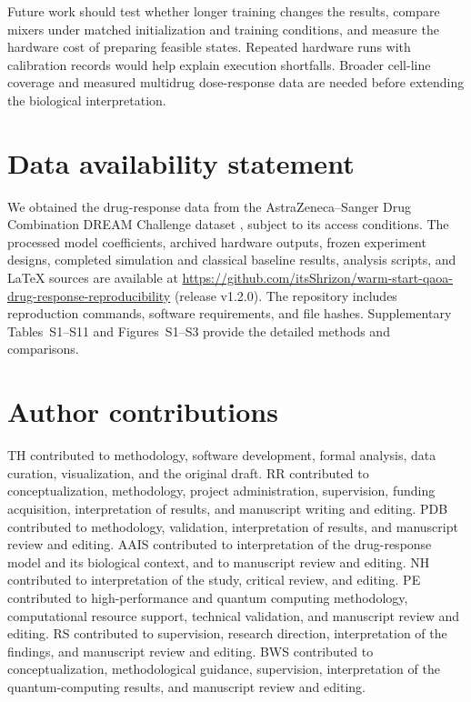 \documentclass[utf8]{FrontiersinHarvard}
\begin{document}
Future work should test whether longer training changes the results, compare mixers under matched initialization and training conditions, and measure the hardware cost of preparing feasible states. Repeated hardware runs with calibration records would help explain execution shortfalls. Broader cell-line coverage and measured multidrug dose-response data are needed before extending the biological interpretation.

\section*{Data availability statement}
We obtained the drug-response data from the AstraZeneca--Sanger Drug Combination DREAM Challenge dataset \citep{menden2019}, subject to its access conditions. The processed model coefficients, archived hardware outputs, frozen experiment designs, completed simulation and classical baseline results, analysis scripts, and LaTeX sources are available at \url{https://github.com/itsShrizon/warm-start-qaoa-drug-response-reproducibility} (release v1.2.0). The repository includes reproduction commands, software requirements, and file hashes. Supplementary Tables~S1--S11 and Figures~S1--S3 provide the detailed methods and comparisons.


\section*{Author contributions}
TH contributed to methodology, software development, formal analysis, data curation, visualization, and the original draft. RR contributed to conceptualization, methodology, project administration, supervision, funding acquisition, interpretation of results, and manuscript writing and editing. PDB contributed to methodology, validation, interpretation of results, and manuscript review and editing. AAIS contributed to interpretation of the drug-response model and its biological context, and to manuscript review and editing. NH contributed to interpretation of the study, critical review, and editing. PE contributed to high-performance and quantum computing methodology, computational resource support, technical validation, and manuscript review and editing. RS contributed to supervision, research direction, interpretation of the findings, and manuscript review and editing. BWS contributed to conceptualization, methodological guidance, supervision, interpretation of the quantum-computing results, and manuscript review and editing.
\end{document}
